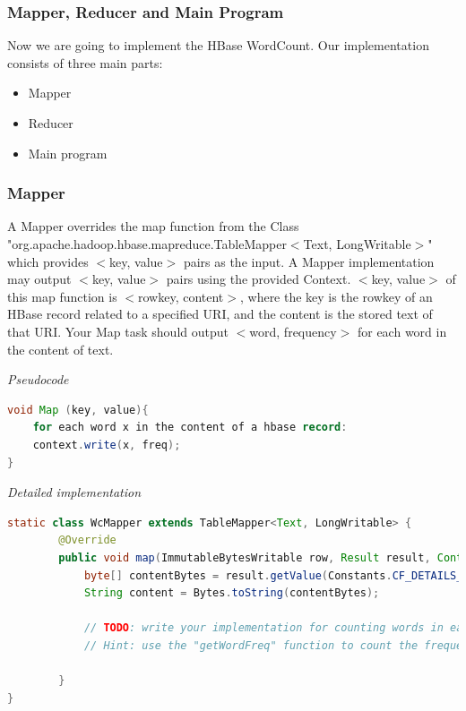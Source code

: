 \subsubsection*{Mapper, Reducer and Main Program }

Now we are going to implement the HBase WordCount. Our implementation consists
of three main parts:

\begin{itemize}
\item Mapper
\item Reducer
\item Main program
 \end{itemize}
 
 
\subsubsection*{Mapper}
A Mapper overrides the map function from the Class
"org.apache.hadoop.hbase.mapreduce.TableMapper$<$Text, LongWritable$>$" which
provides $<$key, value$>$ pairs as the input. A Mapper implementation may
output $<$key, value$>$ pairs using the provided Context.  $<$key, value$>$ of
this map function is $<$rowkey, content$>$, where the key is the rowkey of an
HBase record related to a specified URI, and the content is the stored text of
that URI. Your Map task should output $<$word, frequency$>$ for each word in
the content of text.

\textit{Pseudocode}
\begin{lstlisting}[language=java] 
void Map (key, value){
    for each word x in the content of a hbase record:
    context.write(x, freq);
}
\end{lstlisting}
 
\textit{Detailed implementation}
\begin{lstlisting}[language=java] 
static class WcMapper extends TableMapper<Text, LongWritable> {
		@Override
		public void map(ImmutableBytesWritable row, Result result, Context context) throws IOException, InterruptedException {
			byte[] contentBytes = result.getValue(Constants.CF_DETAILS_BYTES, Constants.QUAL_CONTENT_BYTES);
			String content = Bytes.toString(contentBytes);
			
			// TODO: write your implementation for counting words in each row, and generating a <word, count> pair
			// Hint: use the "getWordFreq" function to count the frequencies of words in content
 
		}
}
\end{lstlisting}

